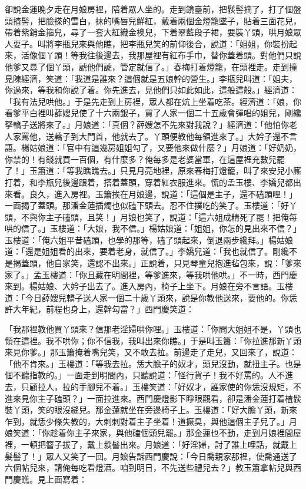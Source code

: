 \begin{showcontents}{}
卻說金蓮晚夕走在月娘房裡，陪着眾人坐的。走到鏡臺前，把䯼髻摘了，打了個盤頭揸髻，把臉搽的雪白，抹的嘴唇兒鮮紅，戴着兩個金燈籠墜子，貼着三面花兒，帶着紫銷金箍兒，尋了一套大紅織金襖兒，下着翠藍段子裙，要裝丫頭，哄月娘眾人耍子。叫將李瓶兒來與他瞧，把李瓶兒笑的前仰後合，說道：「姐姐，你裝扮起來，活像個丫頭！等我往後邊去，我那屋裡有紅布手巾，替你蓋着頭。對他們只說他爹又尋了個丫頭，諕他們諕，管定就信了。」春梅打着燈籠，在頭裡走。走到撞見陳經濟，笑道：「我道是誰來？這個就是五娘幹的營生。」李瓶兒叫道：「姐夫，你過來，等我和你說了着。你先進去，見他們只如此如此，這般這般。」經濟道：「我有法兒哄他。」于是先走到上房裡，眾人都在炕上坐着吃茶。經濟道：「娘，你看爹平白裡叫薛嫂兒使了十六兩銀子，買了人家一個二十五歲會彈唱的姐兒，剛纔拏轎子送將來了。」月娘道：「真個？薛嫂怎不先來對我說？」經濟道：「他怕你老人家罵他，送轎子到大門首，他就去了。丫頭便教他每領進來了。」大妗子還不言語。楊姑娘道：「官中有這幾房姐姐勾了，又要他來做什麼？」月娘道：「好奶奶，你禁的！有錢就買一百個，有什麼多？俺每多是老婆當軍，在這屋裡充數兒罷了！」玉簫道：「等我瞧瞧去。」只見月亮地裡，原來春梅打燈籠，叫了來安兒小廝打着，和李瓶兒後邊跟着，搭着蓋頭，穿着紅衣服進來。慌的孟玉樓、李嬌兒都出來看。良久，進入房裡。玉簫挨在月娘邊，說道：「這個是主子，還不磕頭哩！」一面揭了蓋頭。那潘金蓮插燭也似磕下頭去。忍不住撲吃的笑了。玉樓道：「好丫頭，不與你主子磕頭，且笑！」月娘也笑了，說道：「這六姐成精死了罷！把俺每哄的信了。」玉樓道：「大娘，我不信。」楊姑娘道：「姐姐，你怎的見出來不信？」玉樓道：「俺六姐平昔磕頭，也學的那等，磕了頭起來，倒退兩步纔拜。」楊姑娘道：「還是姐姐看的出來，要着老身，就信了。」李嬌兒道：「我也就信了。剛纔不是揭蓋頭，他自家笑，還認不出來。」正說着，只見琴童兒抱進毡包來，說：「爹來家了。」孟玉樓道：「你且藏在明間裡，等爹進來，等我哄他哄。」不一時，西門慶來到。楊姑娘、大妗子出去了。進入房內，椅子上坐下。月娘在旁不言語。玉樓道：「今日薛嫂兒轎子送人家一個二十歲丫頭來，說是你教他送來，要他的。你恁許大年紀，前程也身上，還幹勾當？」西門慶笑道：

「我那裡教他買丫頭來？信那老淫婦哄你哩。」玉樓道：「你問大姐姐不是，丫頭也領在這裡。我不哄你；你不信我，我叫出來你瞧。」于是叫玉簫：「你拉進那新丫頭來見你爹。」那玉簫掩着嘴兒笑，又不敢去拉。前邊走了走兒，又回來了，說道：「他不肯來。」玉樓道：「等我去拉。恁大膽子的奴才，頭兒沒動，就扭主子。也是個不聽指教的。」一面走到明間內，只聽說道：「怪行貨子！我不好罵的。人不進去，只顧拉人，拉的手腳兒不着。」玉樓笑道：「好奴才，誰家使的你恁沒規矩，不進來見你主子磕頭？」一面拉進來。西門慶燈影下睜眼觀看，卻是潘金蓮打着楂䯼裝丫頭，笑的眼沒縫兒。那金蓮就坐在旁邊椅子上。玉樓道：「好大膽丫頭，新來乍到，就恁少條失教的，大刺刺對着主子坐着！道撅臭，與他這個主子兒了。」月娘笑道：「你趁着你主子來家，與他磕個頭兒罷。」那金蓮也不動，走到月娘裡間屋裡，一頓把簪子拔了，戴上䯼髻出來。月娘道：「好淫婦，討了誰上哩話，就戴上髮髻了！」眾人又笑了一回。月娘告訴西門慶說：「今日喬親家那裡，使喬通送了六個帖兒來，請俺每吃看燈酒。咱到明日，不先送些禮兒去？」教玉簫拿帖兒與西門慶瞧。見上面寫着：


\end{showcontents}

